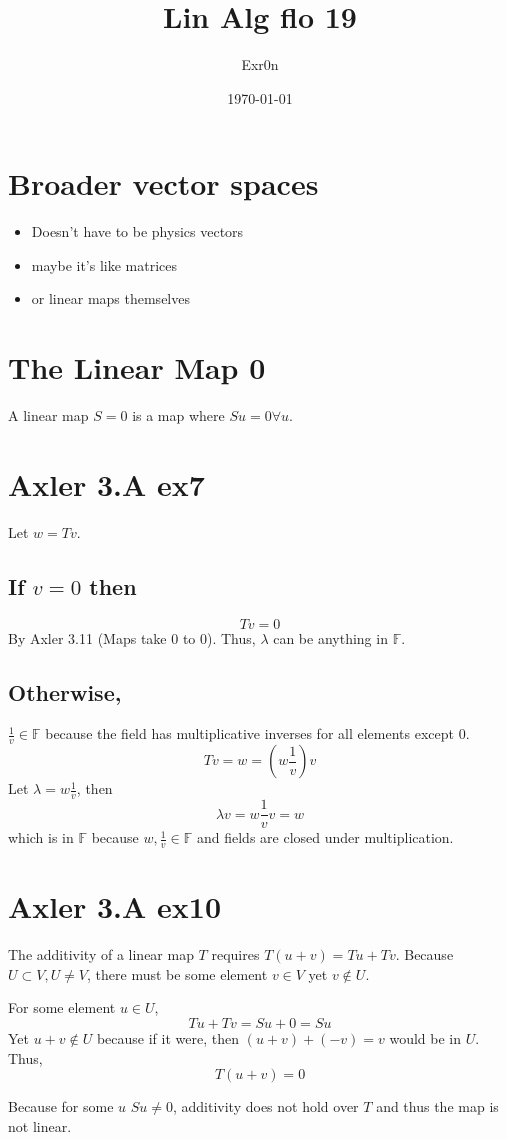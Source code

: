 \documentclass[11pt]{article}
\author{Exr0n}
\date{\today}
\title{Lin Alg flo 19}
\begin{document}
\maketitle
\tableofcontents

\section{Broader vector spaces}
\label{sec:org292b16e}
\begin{itemize}
\item Doesn't have to be physics vectors
\item maybe it's like matrices
\item or linear maps themselves
\end{itemize}
\section{The Linear Map 0}
\label{sec:org1fbf993}
A linear map \(S = 0\) is a map where \(Su = 0 \forall u\).
\section{Axler 3.A ex7}
\label{sec:org3c3404f}
Let \(w = Tv\).

\subsection{If \(v = 0\) then}
\label{sec:orgcf7939a}
$$Tv = 0$$
By Axler 3.11 (Maps take 0 to 0). Thus, \(\lambda\) can be anything in \(\mathbb F\).

\subsection{Otherwise,}
\label{sec:org95a76ea}
\(\frac{1}{v} \in \mathbb F\) because the field has multiplicative inverses for all elements except 0.
$$
   Tv = w = \left( w \frac{1}{v} \right)v
   $$
Let \(\lambda = w \frac{1}{v}\), then
$$ \lambda v = w \frac{1}{v} v = w $$
which is in \(\mathbb F\) because \(w, \frac{1}{v} \in \mathbb F\) and fields are closed under multiplication.

\section{Axler 3.A ex10}
\label{sec:orgb4d7399}
The additivity of a linear map \(T\) requires \(T(u+v) = Tu + Tv\). Because \(U \subset V, U \neq V\), there must be some element \(v \in V\) yet \(v \notin U\).

For some element \(u \in U\),
$$Tu + Tv = Su + 0 = Su$$
Yet \(u+v \notin U\) because if it were, then \((u+v)+(-v) = v\) would be in \(U\). Thus,
$$T(u+v) = 0$$

Because for some \(u\) \(Su\neq 0\), additivity does not hold over \(T\) and thus the map is not linear.
\end{document}
